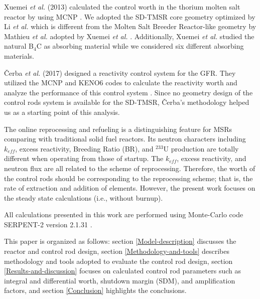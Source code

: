 Xuemei \emph{et al.} (2013) calculated the control worth in the thorium molten salt
reactor by using MCNP \cite{briesmeister2000mcnptm}. We adopted the SD-TMSR
core geometry optimized by Li \emph{et al.} \cite{li_optimization_2018} which
is different from the Molten Salt Breeder Reactor-like geometry by Mathieu \emph{et al.}
\cite{mathieu2006thorium} adopted by Xuemei \emph{et al.} \cite{xuemei2013study}.
Additionally, Xuemei \emph{et al.} studied the natural B$_4$C as absorbing material
while we considered six different absorbing materials.

\v{C}erba \emph{et al.} (2017) designed a reactivity control system for the 
GFR. They utilized the MCNP \cite{briesmeister2000mcnptm} and KENO6 codes 
\cite{petrie1984keno} to calculate the reactivity worth and analyze the 
performance of this control system \cite{vcerba2017optimization}. Since no
geometry design of the control rods system is available for the SD-TMSR, 
\v{C}erba's methodology \cite{vcerba2017optimization} helped us as a starting 
point of this analysis.

The online reprocessing and refueling is a distinguishing feature for MSRs comparing with traditional solid fuel reactors. Its neutron characters including $k_{eff}$, excess reactivity, Breeding Ratio (BR), and $^{233}$U production are totally different when operating from those of startup. The $k_{eff}$, excess reactivity, and neutron flux are all related to the scheme of reprocessing. Therefore, the worth of the control rods should be corresponding to the reprocessing scheme; that is, the rate of extraction and addition of elements. However, the present work focuses on the steady state calculations (i.e., without burnup).

All calculations presented in this work are performed using Monte-Carlo code SERPENT-2 version 2.1.31 \cite{leppanen2014serpent}.

This paper is organized as follows: section \ref{Model-description} discusses the reactor and control rod design, section \ref{Methodology-and-tools} describes methodology and tools adopted to evaluate the control rod design, section \ref{Results-and-discussion} focuses on calculated control rod parameters such as integral and differential worth, shutdown margin (SDM), and amplification factors, and section \ref{Conclusion} highlights the conclusions.